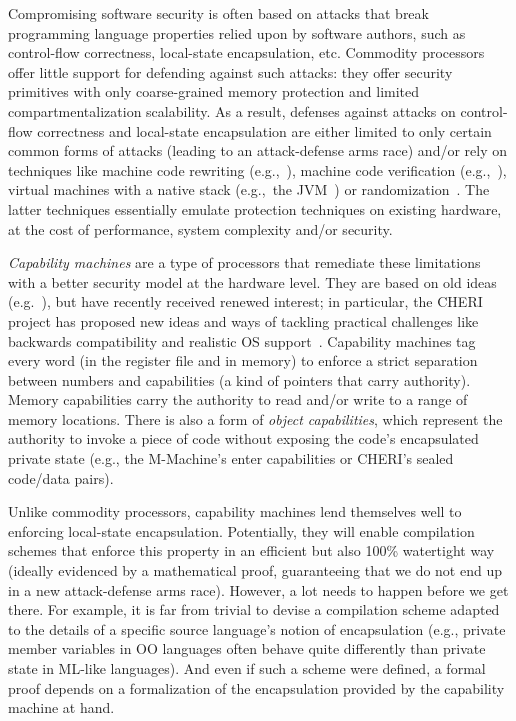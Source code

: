 \documentclass{llncs}
\begin{document}
Compromising software security is often based on attacks that break programming
language properties relied upon by software authors, such as control-flow
correctness, local-state encapsulation, etc. Commodity processors offer little
support for defending against such attacks: they offer security primitives with
only coarse-grained memory protection and limited compartmentalization
scalability. As a result, defenses against attacks on control-flow correctness
and local-state encapsulation are either limited to only certain common forms of
attacks (leading to an attack-defense arms race) and/or rely on techniques like
machine code rewriting
(e.g.,~\cite{wahbe_efficient_1993,abadi_control-flow_2005}), machine code
verification (e.g.,~\cite{morrisett_system_1999}), virtual machines with a
native stack (e.g.,~the JVM~\cite{lindholm_java_2014}) or
randomization~\cite{forrest_building_1997}. The latter techniques essentially
emulate protection techniques on existing hardware, at the cost of performance,
system complexity and/or security.

\emph{Capability machines} are a type of processors that
remediate these limitations with a better security model at
the hardware level. They are based on old ideas
(e.g.~\cite{Carter:1994:HSF:195473.195579,Dennis:1966:PSM:365230.365252,shapiro_eros:_1999}),
but have recently received renewed interest; in particular, the CHERI
project has proposed new ideas and ways of tackling practical
challenges like backwards compatibility and realistic OS
support~\cite{Watson2015Cheri,Woodruff:2014:CCM:2665671.2665740}. Capability
machines tag every word (in the register file and in memory) to
enforce a strict separation between numbers and capabilities (a kind
of pointers that carry authority). Memory capabilities carry
the authority to read and/or write to a range of memory
locations. There is also a form of \emph{object capabilities}, which represent the
authority to invoke a piece of code without exposing the code's
encapsulated private state (e.g., the M-Machine's enter capabilities or
CHERI's sealed code/data pairs).

Unlike commodity processors, capability machines lend themselves well to
enforcing local-state encapsulation. Potentially, they will enable compilation
schemes that enforce this property in an efficient but also 100\% watertight way
(ideally evidenced by a mathematical proof, guaranteeing that we do not end up
in a new attack-defense arms race). However, a lot needs to happen before we get
there. For example, it is far from trivial to devise a compilation scheme
adapted to the details of a specific source language's notion of encapsulation
(e.g., private member variables in OO languages often behave quite differently
than private state in ML-like languages). And even if such a scheme were
defined, a formal proof depends on a formalization of the encapsulation provided
by the capability machine at hand.
\end{document}
